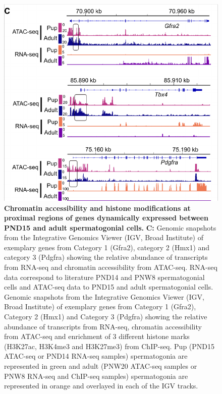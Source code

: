 \documentclass[12pt,twoside]{reedthesis}
\begin{document}
\begin{subfigures}
\begin{figure}[H]

{\centering \includegraphics{thesis_files/figure-latex/df3b-1} 

}

\caption[Chromatin accessibility and histone modifications at proximal regions of genes dynamically expressed between PND15 and adult spermatogonial cells]{\textbf{Chromatin accessibility and histone modifications at proximal regions of genes dynamically expressed between PND15 and adult spermatogonial cells.} \newline \textbf{C:} Genomic snapshots from the Integrative Genomics Viewer (IGV, Broad Institute) of exemplary genes from Category 1 (Gfra2), category 2 (Hmx1) and category 3 (Pdgfra) showing the relative abundance of transcripts from RNA-seq and chromatin accessibility from ATAC-seq. RNA-seq data correspond to literature PND14 and PNW8 spermatogonial cells and ATAC-seq data to PND15 and adult spermatogonial cells. Genomic snapshots from the Integrative Genomics Viewer (IGV, Broad Institute) of exemplary genes from Category 1 (Gfra2), Category 2 (Hmx1) and Category 3 (Pdgfra) showing the relative abundance of transcripts from RNA-seq, chromatin accessibility from ATAC-seq and enrichment of 3 different histone marks (H3K27ac, H3K4me3 and H3K27me3) from ChIP-seq. Pup (PND15 ATAC-seq or PND14 RNA-seq samples) spermatogonia are represented in green and adult (PNW20 ATAC-seq samples or PNW8 RNA-seq and ChIP-seq samples) spermatogonia are represented in orange and overlayed in each of the IGV tracks.}\label{fig:df3b}
\end{figure}
\end{subfigures}
\end{document}
